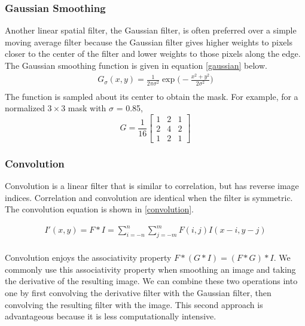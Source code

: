 \documentclass[twoside]{article}
\begin{document}
\subsubsection{Gaussian Smoothing}
Another linear spatial filter, the Gaussian filter, is often preferred over a simple moving average filter because the Gaussian filter gives higher weights to pixels closer to the center of the filter and lower weights to those pixels along the edge. The Gaussian smoothing function is given in equation \ref{gaussian} below.
\begin{equation}
  \label{gaussian}
  \begin{aligned}
  	G_\sigma(x,y) = \frac{1}{2\pi\sigma^2} \exp \bigg(-\frac{x^2 + y^2}{2\sigma^2} \bigg)\\
  \end{aligned}
\end{equation}
The function is sampled about its center to obtain the mask. For example, for a normalized $3\times3$ mask with $\sigma$ = 0.85, 
\[
G = \frac{1}{16}
\begin{bmatrix}
1 & 2 & 1\\
2 & 4 & 2\\
1 & 2 & 1
\end{bmatrix}
\]

\subsubsection{Convolution}
Convolution is a linear filter that is similar to correlation, but has reverse image indices. Correlation and convolution are identical when the filter is symmetric. The convolution equation is shown in \ref{convolution}.

\begin{equation}
  \label{convolution}
  \begin{aligned}
  	I'(x,y) = F * I = \sum_{i=-n}^n \sum_{j=-m}^m F(i,j)I(x-i,y-j)\\
  \end{aligned}
\end{equation}

Convolution enjoys the associativity property $F*(G*I) = (F*G)*I$. We commonly use this associativity property when smoothing an image and taking the derivative of the resulting image.  We can combine these two operations into one by first convolving the derivative filter with the Gaussian filter, then convolving the resulting filter with the image.  This second approach is advantageous because it is less computationally intensive.
\end{document}

